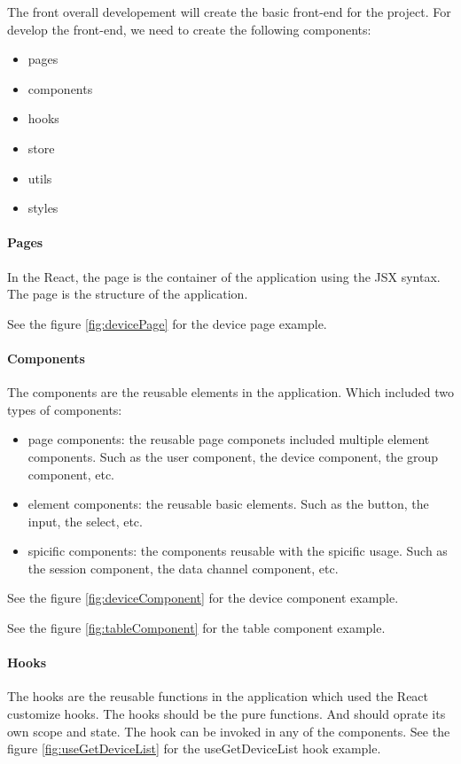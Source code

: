The front overall developement will create the basic front-end for the project.
For develop the front-end, we need to create the following components:
\begin{itemize}
    \item pages
    \item components
    \item hooks
    \item store
    \item utils
    \item styles
\end{itemize}

\paragraph{Pages}
In the React, the page is the container of the application using the JSX syntax.
The page is the structure of the application. 

See the figure \ref{fig:devicePage} for the device page example.



\paragraph{Components}
The components are the reusable elements in the application.
Which included two types of components: 
\begin{itemize}
    \item page components: the reusable page componets included multiple element components. 
    Such as the user component, the device component, the group component, etc.
    \item element components: the reusable basic elements.
    Such as the button, the input, the select, etc.
    \item spicific components: the components reusable with the spicific usage.
    Such as the session component, the data channel component, etc.
\end{itemize}

See the figure \ref{fig:deviceComponent} for the device component example.

See the figure \ref{fig:tableComponent} for the table component example.




\paragraph{Hooks}
The hooks are the reusable functions in the application which used the React customize hooks.
The hooks should be the pure functions. And should oprate its own scope and state.
The hook can be invoked in any of the components. 
See the figure \ref{fig:useGetDeviceList} for the useGetDeviceList hook example.

